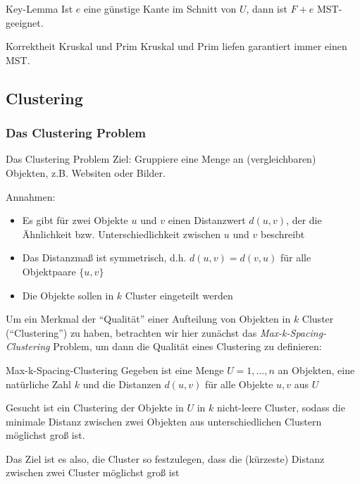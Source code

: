 \documentclass{panikzettel}
\begin{document}
{\begin{defi}{Key-Lemma}
	Ist $e$ eine günstige Kante im Schnitt von $U$, dann ist $F+e$ MST-geeignet.
\end{defi}


\begin{theo}{Korrektheit Kruskal und Prim}
	Kruskal und Prim liefen garantiert immer einen MST.
\end{theo}

\subsection{Clustering}

\subsubsection{Das Clustering Problem}

\begin{defi}{Das Clustering Problem}
	Ziel: Gruppiere eine Menge an (vergleichbaren) Objekten, z.B. Websiten oder Bilder.
	
	Annahmen:
	\begin{itemize}
		\item Es gibt für zwei Objekte $u$ und $v$ einen Distanzwert $d(u,v)$, der die Ähnlichkeit bzw. Unterschiedlichkeit zwischen $u$ und $v$ beschreibt
		\item Das Distanzmaß ist symmetrisch, d.h. $d(u,v) = d(v,u)$ für alle Objektpaare $\{u,v\}$
		\item Die Objekte sollen in $k$ Cluster eingeteilt werden
	\end{itemize}
\end{defi}

Um ein Merkmal der ``Qualität'' einer Aufteilung von Objekten in $k$ Cluster (``Clustering'') zu haben, betrachten wir hier zunächst das \emph{Max-k-Spacing-Clustering} Problem, um dann die Qualität eines Clustering zu definieren:

\begin{defi}{Max-k-Spacing-Clustering}
	Gegeben ist eine Menge $U = 1,\dots, n$ an Objekten, eine natürliche Zahl $k$ und die Distanzen $d(u,v)$ für alle Objekte $u,v$ aus $U$
	
	Gesucht ist ein Clustering der Objekte in $U$ in $k$ nicht-leere Cluster, sodass die minimale Distanz zwischen zwei Objekten aus unterschiedlichen Clustern möglichst groß ist. 
	
	Das Ziel ist es also, die Cluster so festzulegen, dass die (kürzeste) Distanz zwischen zwei Cluster möglichst groß ist
\end{defi}

}
\end{document}
